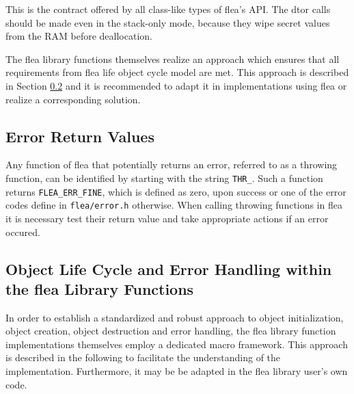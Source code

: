 \documentclass[a4paper,11pt]{scrartcl}
\begin{document}
This is the contract offered by all class-like types of flea's API. The dtor calls should
be made even in the stack-only mode, because they wipe secret values from the
RAM before deallocation.

The flea library functions themselves realize an approach which ensures that all
requirements from flea life object cycle model are met. This approach is
described in Section \ref{fleaFuncSkel} and it is recommended to adapt it in implementations
using flea or realize a corresponding solution.


\subsection{Error Return Values}
\label{secErrRet}
Any function of flea that potentially returns an error, referred to as a throwing function, can be identified by starting with the string
\verb#THR_#. Such a function returns \verb#FLEA_ERR_FINE#, which is defined as
zero, upon success or one of the error codes define in \verb#flea/error.h# otherwise.
When calling throwing functions in flea it is necessary test their return value
and take appropriate actions if an error occured.

\subsection{Object Life Cycle and Error Handling within the flea Library Functions}
\label{fleaFuncSkel}
In order to establish a standardized and robust approach to object initialization,
object creation, object destruction and error handling, the flea library
function implementations themselves employ a dedicated macro framework. This
approach is described in the following to facilitate the understanding of the
implementation. Furthermore, it may be be adapted in the flea library user's own
code.
\end{document}
